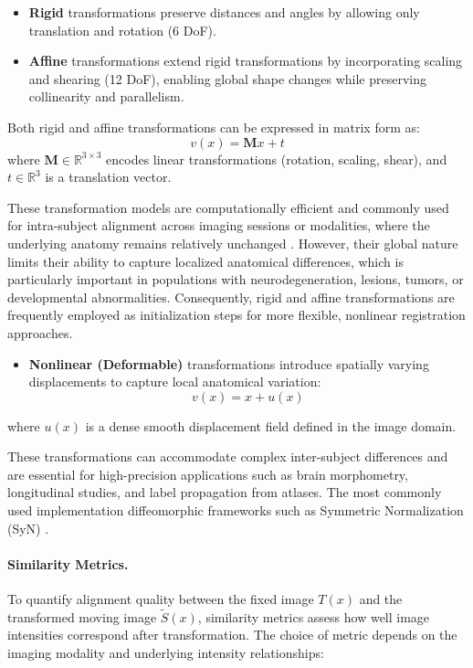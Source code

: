 \begin{itemize}
    \item \textbf{Rigid} transformations preserve distances and angles by allowing only translation and rotation (6 DoF).
    
    \item \textbf{Affine} transformations extend rigid transformations by incorporating scaling and shearing (12 DoF), enabling global shape changes while preserving collinearity and parallelism.
\end{itemize}

Both rigid and affine transformations can be expressed in matrix form as:
\begin{equation}
    v(x) = \mathbf{M}x + t
    \label{eq:affine}
\end{equation}
where \( \mathbf{M} \in \mathbb{R}^{3 \times 3} \) encodes linear transformations (rotation, scaling, shear), and \( t \in \mathbb{R}^3 \) is a translation vector. 

These transformation models are computationally efficient and commonly used for intra-subject alignment across imaging sessions or modalities, where the underlying anatomy remains relatively unchanged \cite{Jenkinson2002-ab}. However, their global nature limits their ability to capture localized anatomical differences, which is particularly important in populations with neurodegeneration, lesions, tumors, or developmental abnormalities. Consequently, rigid and affine transformations are frequently employed as initialization steps for more flexible, nonlinear registration approaches.
\begin{itemize}
\item \textbf{Nonlinear (Deformable)} transformations introduce spatially varying displacements to capture local anatomical variation:
\begin{equation}
    v(x) = x + u(x)
    \label{eq:deformable}
\end{equation}
\end{itemize}
where \( u(x) \) is a dense smooth displacement field defined in the image domain. 

These transformations can accommodate complex inter-subject differences and are essential for high-precision applications such as brain morphometry, longitudinal studies, and label propagation from atlases. The most commonly used implementation diffeomorphic frameworks such as Symmetric Normalization (SyN) \cite{Avants2008-ek, Beg2005-yo}.

\paragraph{Similarity Metrics.}
To quantify alignment quality between the fixed image \( T(x) \) and the transformed moving image \( \tilde{S}(x) \), similarity metrics assess how well image intensities correspond after transformation. The choice of metric depends on the imaging modality and underlying intensity relationships:

